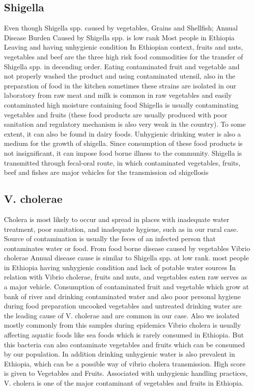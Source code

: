 \documentclass[
  letterpaper,
  DIV=11,
  numbers=noendperiod]{scrartcl}
\begin{document}
\subsection*{Shigella}\label{shigella}

Even though Shigella spp. caused by vegetables, Grains and Shellfish;
Annual Disease Burden Caused by Shigella spp. is low rank Most people in
Ethiopia Leaving and having unhygienic condition In Ethiopian context,
fruits and nuts, vegetables and beef are the three high risk food
commodities for the transfer of Shigella spp. in decending order. Eating
contaminated fruit and vegetable and not properly washed the product and
using contaminated utensil‚ also in the preparation of food in the
kitchen sometimes these strains are isolated in our laboratory from raw
meat and milk is common in raw vegetables and easily contaminated high
moisture containing food Shigella is usually contaminating vegetables
and fruits (these food products are usually produced with poor
sanitation and regulatory mechanism is also very weak in the country).
To some extent, it can also be found in dairy foods. Unhygienic drinking
water is also a medium for the growth of shigella. Since consumption of
these food products is not insignificant, it can impose food borne
illness to the community. Shigella is transmitted through fecal-oral
route, in which contaminated vegetables, fruits, beef and fishes are
major vehicles for the transmission od shigellosis

\subsection*{V. cholerae}\label{v.-cholerae}

Cholera is most likely to occur and spread in places with inadequate
water treatment, poor sanitation, and inadequate hygiene, such as in our
rural case. Source of contamination is usually the feces of an infected
person that contaminates water or food. From food borne disease caused
by vegetables Vibrio cholerae Annual disease cause is similar to
Shigella spp. at low rank. most people in Ethiopia having unhygienic
condition and lack of potable water sources In relation with Vibrio
cholerae, fruits and nuts, and vegetables eaten raw serves as a major
vehicle. Consumption of contaminated fruit and vegetable which grow at
bank of river and drinking contaminated water and also poor personal
hygiene during food preparation uncooked vegetables and untreated
drinking water are the leading cause of V. cholerae and are common in
our case. Also we isolated mostly commonly from this samples during
epidemics Vibrio cholera is usually affecting aquatic foods like sea
foods which is rarely consumed in Ethiopia. But this bacteria can also
contaminate vegetables and fruits which can be consumed by our
population. In addition drinking unhygienic water is also prevalent in
Ethiopia, which can be a possible way of vibrio cholera transmission.
High score is given to Vegetables and Fruits. Associated with unhygienic
handling practices, V. cholera is one of the major contaminant of
vegetables and fruits in Ethiopia.
\end{document}
